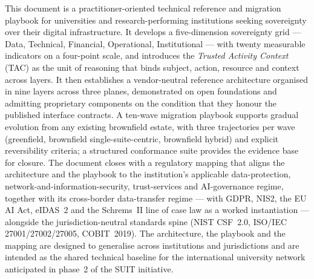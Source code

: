 
\noindent This document is a practitioner-oriented technical reference
and migration playbook for universities and research-performing
institutions seeking sovereignty over their digital infrastructure. It develops a
five-dimension sovereignty grid --- Data, Technical, Financial,
Operational, Institutional --- with twenty measurable indicators on a
four-point scale, and introduces the \emph{Trusted Activity Context}
(TAC) as the unit of reasoning that binds subject, action, resource
and context across layers. It then establishes a vendor-neutral
reference architecture organised in nine layers across three planes,
demonstrated on open foundations and admitting proprietary components
on the condition that they honour the published interface contracts.
A ten-wave migration playbook supports gradual evolution from any
existing brownfield estate, with three trajectories per wave
(greenfield, brownfield single-suite-centric, brownfield hybrid) and
explicit reversibility criteria; a structured conformance suite
provides the evidence base for closure. The document closes with a
regulatory mapping that aligns the architecture and the playbook to
the institution's applicable data-protection, network-and-information-security,
trust-services and AI-governance regime, together with its
cross-border data-transfer regime --- with GDPR, NIS2, the EU AI Act,
eIDAS~2 and the Schrems~II line of case law as a worked instantiation
--- alongside the jurisdiction-neutral standards spine (NIST CSF~2.0,
ISO/IEC 27001/27002/27005, COBIT~2019). The architecture, the
playbook and the mapping are designed to generalise across
institutions and jurisdictions and are intended as the shared technical
baseline for the international university network anticipated in phase~2
of the SUIT initiative.
